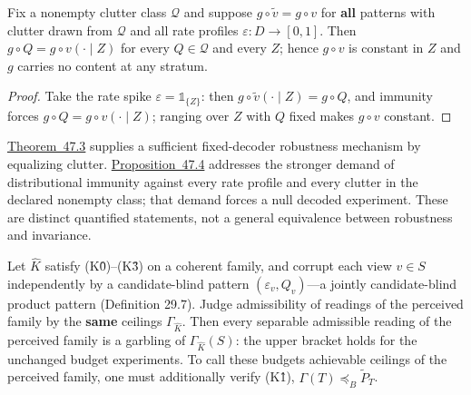 \begin{thmplain}

Fix a nonempty clutter class \(\mathcal{Q}\) and suppose \(g \circ \tilde v = g \circ v\) for \textbf{all} patterns with clutter drawn from \(\mathcal{Q}\) and all rate profiles \(\varepsilon : D \to [0,1]\). Then \(g \circ Q = g \circ v(\cdot \mid Z)\) for every \(Q \in \mathcal{Q}\) and every \(Z\); hence \(g \circ v\) is constant in \(Z\) and \(g\) carries no content at any stratum.
\end{thmplain}

\begin{proof}

Take the rate spike \(\varepsilon = \mathbb{1}_{\{Z\}}\): then \(g \circ \tilde v(\cdot \mid Z) = g \circ Q\), and immunity forces \(g \circ Q = g \circ v(\cdot \mid Z)\); ranging over \(Z\) with \(Q\) fixed makes \(g \circ v\) constant.
\end{proof}

\hyperlink{stmt:47.3}{Theorem~47.3} supplies a sufficient fixed-decoder robustness mechanism by equalizing clutter. \hyperlink{stmt:47.4}{Proposition~47.4} addresses the stronger demand of distributional immunity against every rate profile and every clutter in the declared nonempty class; that demand forces a null decoded experiment. These are distinct quantified statements, not a general equivalence between robustness and invariance.


\begin{thmplain}

Let \(\widehat{K}\) satisfy (K0̂)--(K3̂) on a coherent family, and corrupt each view \(v \in S\) independently by a candidate-blind pattern \((\varepsilon_v, Q_v)\)---\hspace{0pt}a jointly candidate-blind product pattern (Definition 29.7). Judge admissibility of readings of the perceived family by the \textbf{same} ceilings \(\Gamma_{\widehat K}\). Then every separable admissible reading of the perceived family is a garbling of \(\Gamma_{\widehat K}(S)\): the upper bracket holds for the unchanged budget experiments. To call these budgets achievable ceilings of the perceived family, one must additionally verify (K1̂), \(\Gamma(T)\preceq_B\widetilde P_T\).
\end{thmplain}

